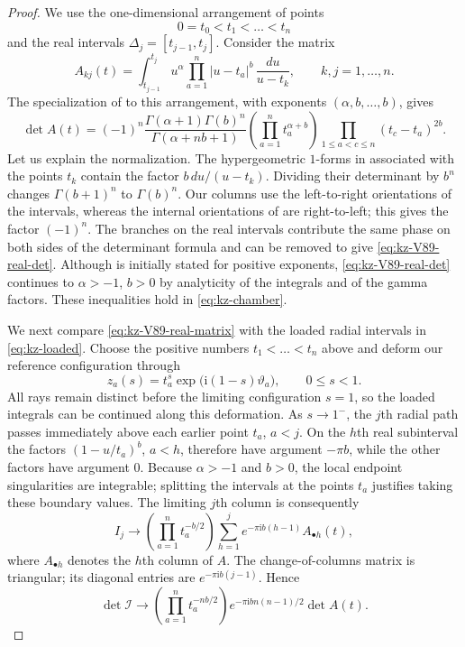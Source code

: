\documentclass[12pt]{amsart}
\theoremstyle{definition}
\numberwithin{equation}{section}
\theoremstyle{definition}
\let\mc\mathcal
\let\le\leqslant
\def\beq{\begin{equation}}
\def\eeq{\end{equation}}
\begin{document}
\begin{proof}
We use the one-dimensional arrangement of points
\[
 0=t_0<t_1<\dots<t_n
\]
and the real intervals $\Delta_j=[t_{j-1},t_j]$.
Consider the matrix
\beq\label{eq:kz-V89-real-matrix}
 A_{kj}(t)=\int_{t_{j-1}}^{t_j}
 u^\alpha\prod_{a=1}^n|u-t_a|^b\,
 \frac{du}{u-t_k},\qquad k,j=1,\ldots,n.
\eeq
The specialization of \cite[Theorem~1.1]{V89} to this
arrangement, with exponents $(\alpha,b,\ldots,b)$, gives
\beq\label{eq:kz-V89-real-det}
 \det A(t)=(-1)^n
 \frac{\Gamma(\alpha+1)\Gamma(b)^n}
 {\Gamma(\alpha+nb+1)}
 \left(\prod_{a=1}^n t_a^{\alpha+b}\right)
 \prod_{1\le a<c\le n}(t_c-t_a)^{2b}.
\eeq
Let us explain the normalization. The hypergeometric
$1$-forms in \cite{V89} associated with the points $t_k$
contain the factor $b\,du/(u-t_k)$.
Dividing their determinant by $b^n$ changes
$\Gamma(b+1)^n$ to $\Gamma(b)^n$.
Our columns use the left-to-right orientations of the
intervals, whereas the internal orientations of \cite{V89}
are right-to-left; this gives the factor $(-1)^n$.
The branches on the real intervals contribute the same
phase on both sides of the determinant formula and can be
removed to give \eqref{eq:kz-V89-real-det}.
Although \cite[Theorem~1.1]{V89} is initially stated for
positive exponents, \eqref{eq:kz-V89-real-det} continues to
$\alpha>-1$, $b>0$ by analyticity of the integrals and of the
gamma factors. These inequalities hold in \eqref{eq:kz-chamber}.

We next compare \eqref{eq:kz-V89-real-matrix} with the loaded
radial intervals in \eqref{eq:kz-loaded}.
Choose the positive numbers $t_1<\dots<t_n$ above and deform
our reference configuration through
\[
 z_a(s)=t_a^s\exp\bigl(\mathrm{i}(1-s)\vartheta_a\bigr),
 \qquad 0\le s<1.
\]
All rays remain distinct before the limiting configuration
$s=1$, so the loaded integrals can be continued along this
deformation. As $s\to1^-$, the $j$th radial path passes
immediately above each earlier point $t_a$, $a<j$.
On the $h$th real subinterval the factors
$(1-u/t_a)^b$, $a<h$, therefore have argument $-\pi b$,
while the other factors have argument $0$.
Because $\alpha>-1$ and $b>0$, the local endpoint
singularities are integrable; splitting the intervals at the
points $t_a$ justifies taking these boundary values.
The limiting $j$th column is consequently
\beq\label{eq:kz-cycle-transition}
 I_j\longrightarrow
 \left(\prod_{a=1}^n t_a^{-b/2}\right)
 \sum_{h=1}^j e^{-\pi\mathrm{i}b(h-1)}A_{\bullet h}(t),
\eeq
where $A_{\bullet h}$ denotes the $h$th column of $A$.
The change-of-columns matrix is triangular; its diagonal
entries are $e^{-\pi\mathrm{i}b(j-1)}$. Hence
\beq\label{eq:kz-det-real-boundary}
 \det\mc I\longrightarrow
 \left(\prod_{a=1}^n t_a^{-nb/2}\right)
 e^{-\pi\mathrm{i}b n(n-1)/2}\det A(t).
\eeq


\end{proof}
\end{document}
